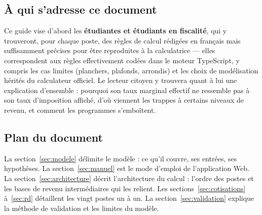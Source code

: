 \subsection{À qui s'adresse ce document}

Ce guide vise d'abord les \textbf{étudiantes et étudiants en fiscalité}, qui
y trouveront, pour chaque poste, des règles de calcul rédigées en français
mais suffisamment précises pour être reproduites à la calculatrice --- elles
correspondent aux règles effectivement codées dans le moteur TypeScript,
y compris les cas limites (planchers, plafonds, arrondis) et les choix de
modélisation hérités du calculateur officiel. Le lecteur citoyen y trouvera
quant à lui une explication d'ensemble : pourquoi son taux marginal effectif
ne ressemble pas à son taux d'imposition affiché, d'où viennent les
\og trappes \fg{} à certains niveaux de revenu, et comment les programmes
s'emboîtent.

\subsection{Plan du document}

La section~\ref{sec:modele} délimite le modèle : ce qu'il couvre, ses
entrées, ses hypothèses. La section~\ref{sec:manuel} est le mode d'emploi de
l'application Web. La section~\ref{sec:architecture} décrit l'architecture du
calcul : l'ordre des postes et les bases de revenu intermédiaires qui les
relient. Les sections~\ref{sec:cotisations} à~\ref{sec:rd} détaillent les
vingt postes un à un. La section~\ref{sec:validation} explique la méthode de
validation et les limites du modèle.
